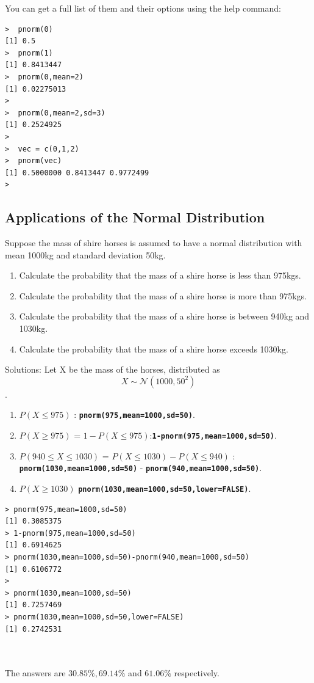 \documentclass[a4paper,12pt]{article}
\begin{document}
You can get a full list of them and their options using the help command:

\begin{verbatim}
>  pnorm(0)
[1] 0.5
>  pnorm(1)
[1] 0.8413447
>  pnorm(0,mean=2)
[1] 0.02275013
>
>  pnorm(0,mean=2,sd=3)
[1] 0.2524925
>
>  vec = c(0,1,2)         
>  pnorm(vec)
[1] 0.5000000 0.8413447 0.9772499
>
\end{verbatim}
\subsection{Applications of the Normal Distribution}
Suppose the mass of shire horses is assumed to have a normal distribution with mean 1000kg and standard deviation 50kg. 
\begin{enumerate}
\item Calculate the probability that the mass of a shire horse is less than 975kgs.
\item Calculate the probability that the mass of a shire horse is more than 975kgs.
\item Calculate the probability that the mass of a shire horse is between 940kg and 1030kg.         
\item Calculate the probability that the mass of a shire horse exceeds 1030kg.                
\end{enumerate}

Solutions: Let X be the mass of the horses, distributed as
\[ X \sim \mathcal{N}(1000,50^2)\].
\begin{enumerate}
\item $P(X \leq 975)$ : \texttt{\textbf{pnorm(975,mean=1000,sd=50)}}.
\item $P(X \geq 975)$ =  $ 1- P(X \leq 975)$:\texttt{\textbf{1-pnorm(975,mean=1000,sd=50)}}. 
\item $P(940 \leq X \leq 1030)$ = $P(X \leq 1030) -  P(X \leq 940)$  : \texttt{\textbf{pnorm(1030,mean=1000,sd=50)}} - \texttt{\textbf{pnorm(940,mean=1000,sd=50)}}.     
\item $P(X \geq 1030)$       \texttt{\textbf{pnorm(1030,mean=1000,sd=50,lower=FALSE)}}.
\end{enumerate}
\begin{verbatim}
> pnorm(975,mean=1000,sd=50)
[1] 0.3085375
> 1-pnorm(975,mean=1000,sd=50)
[1] 0.6914625
> pnorm(1030,mean=1000,sd=50)-pnorm(940,mean=1000,sd=50)
[1] 0.6106772
>
> pnorm(1030,mean=1000,sd=50)
[1] 0.7257469
> pnorm(1030,mean=1000,sd=50,lower=FALSE)
[1] 0.2742531



\end{verbatim}
The answers are $30.85\%,69.14\%$ and $61.06\%$ respectively.
\end{document}
